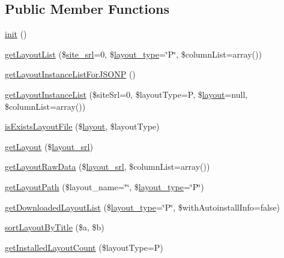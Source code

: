 \subsection*{Public Member Functions}
\begin{DoxyCompactItemize}
\item 
\hyperlink{classlayoutModel_a0e38b226e6c6f4ceae728725e40178fd}{init} ()
\item 
\hyperlink{classlayoutModel_afc353a7801c6cd15af3822e6fdac9ba2}{get\+Layout\+List} (\$\hyperlink{ko_8install_8php_a8b1406b4ad1048041558dce6bfe89004}{site\+\_\+srl}=0, \$\hyperlink{ko_8install_8php_a0532d89570cfdaebc628afac2ff5a81b}{layout\+\_\+type}=\char`\"{}P\char`\"{}, \$column\+List=array())
\item 
\hyperlink{classlayoutModel_a8093366d9ab2988d5ae6d51856752f91}{get\+Layout\+Instance\+List\+For\+J\+S\+O\+NP} ()
\item 
\hyperlink{classlayoutModel_a51db957e152d8149dcf0b20d4528c469}{get\+Layout\+Instance\+List} (\$site\+Srl=0, \$layout\+Type=\textquotesingle{}P\textquotesingle{}, \$\hyperlink{classlayout}{layout}=null, \$column\+List=array())
\item 
\hyperlink{classlayoutModel_aad01da0a48d593382de1d46df2c6d2c2}{is\+Exists\+Layout\+File} (\$\hyperlink{classlayout}{layout}, \$layout\+Type)
\item 
\hyperlink{classlayoutModel_a46f845328e6b65e772408ceb990adb6b}{get\+Layout} (\$\hyperlink{ko_8install_8php_a70054876db09b2519a1726663c8dd9e7}{layout\+\_\+srl})
\item 
\hyperlink{classlayoutModel_a008cf11689e020eb48ac719eb33979a6}{get\+Layout\+Raw\+Data} (\$\hyperlink{ko_8install_8php_a70054876db09b2519a1726663c8dd9e7}{layout\+\_\+srl}, \$column\+List=array())
\item 
\hyperlink{classlayoutModel_a78119afb7cf8bf74aee4f1a093f74dc5}{get\+Layout\+Path} (\$layout\+\_\+name=\char`\"{}\char`\"{}, \$\hyperlink{ko_8install_8php_a0532d89570cfdaebc628afac2ff5a81b}{layout\+\_\+type}=\char`\"{}P\char`\"{})
\item 
\hyperlink{classlayoutModel_aed10488985735bd1adda014388b3a781}{get\+Downloaded\+Layout\+List} (\$\hyperlink{ko_8install_8php_a0532d89570cfdaebc628afac2ff5a81b}{layout\+\_\+type}=\char`\"{}P\char`\"{}, \$with\+Autoinstall\+Info=false)
\item 
\hyperlink{classlayoutModel_a2fe5cbdc4be434f56cc1fed03588d1f4}{sort\+Layout\+By\+Title} (\$a, \$b)
\item 
\hyperlink{classlayoutModel_ac7e0358b25cb843323eb5027b040ecf7}{get\+Installed\+Layout\+Count} (\$layout\+Type=\textquotesingle{}P\textquotesingle{})

\end{DoxyCompactItemize}
